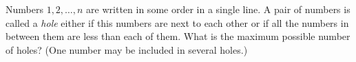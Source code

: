 \problem
\label{2014/en/team/senior/2:problem}%
Numbers $1, 2, \ldots, n$ are written in some order in a single line.
A pair of numbers is called a \emph{hole} either if this numbers are next to
each other or if all the numbers in between them are less than each of them.
What is the maximum possible number of holes?
(One number may be included in several holes.)
\solution
\endproblem
